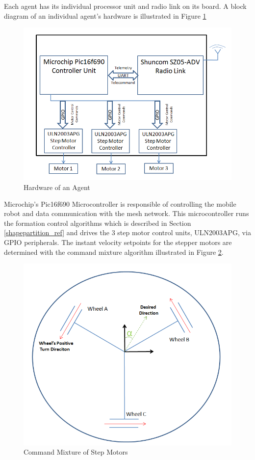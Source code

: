 Each agent has its individual processor unit and radio link on its board. A block diagram of an individual agent's hardware is illustrated in Figure \ref{indhardware_ref}
		
\begin{figure}[H]
\caption{Hardware of an Agent} \label{indhardware_ref}
\centerline{\includegraphics[scale = 0.70]{agent}}
\end{figure} 
		
Microchip's Pic16f690 Microcontroller is responsible of controlling the mobile robot and data communication with the mesh network. This microcontroller runs the formation control algorithms which is described in Section \ref{shapepartition_ref} and drives the 3 step motor control units, ULN2003APG, via GPIO peripherals. The instant velocity setpoints for the stepper motors  are determined with the command mixture algorithm illustrated in Figure \ref{ccmb_ref}.
		
\begin{figure}[H]
\caption{Command Mixture of Step Motors} \label{ccmb_ref}
\centerline{\includegraphics[scale = 0.65]{ccmb}}
\end{figure} 


